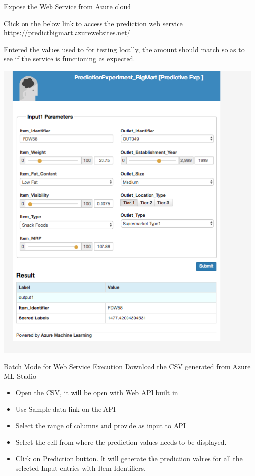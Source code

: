Expose the Web Service from Azure cloud

Click on the below link to access the prediction web service  
https://predictbigmart.azurewebsites.net/

Entered the values used to for testing locally, the amount should 
match so as to see if the service is functioning as expected.


\includegraphics[width=\columnwidth]{Images/mlstudio/WebService.png}


Batch Mode for Web Service Execution
Download the CSV generated from Azure ML Studio 
\begin{itemize}
\item Open the CSV, it will be open with Web API built in
\item Use Sample data link on the API
\item Select the range of columns and provide as input to API
\item Select the cell from where the prediction values needs to be displayed.
\item Click on Prediction button.
It will generate the prediction values for all the selected Input entries 
with Item Identifiers.
\end{itemize}



